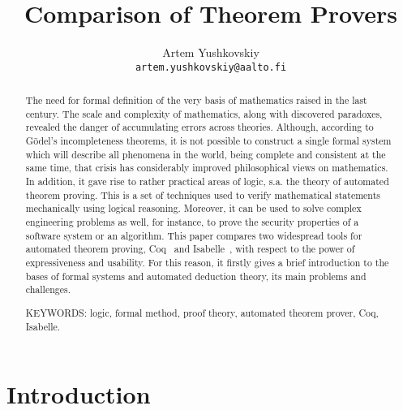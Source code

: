 \documentclass[article]{aaltoseries}
\begin{document}

\title{Comparison of Theorem Provers}

\author{Artem Yushkovskiy
\\\textnormal{\texttt{artem.yushkovskiy@aalto.fi}}}


\maketitle


\begin{abstract}

The need for formal definition of the very basis of mathematics raised in the last century.
The scale and complexity of mathematics, along with discovered paradoxes, revealed the danger of accumulating errors across theories. Although, according to Gödel's incompleteness theorems, it is not possible to construct a single formal system which will describe all phenomena in the world, being complete and consistent at the same time, that crisis has considerably improved philosophical views on mathematics. 
In addition, it gave rise to rather practical areas of logic, s.a. the theory of automated theorem proving. This is a set of techniques used to verify mathematical statements mechanically using logical reasoning. Moreover, it can be used to solve complex engineering problems as well, for instance, to prove the security properties of a software system or an algorithm.
This paper compares two widespread tools for automated theorem proving, Coq~\cite{tool_Coq} and Isabelle~\cite{tool_Isabelle}, with respect to the power of expressiveness and usability. For this reason, it firstly gives a brief introduction to the bases of formal systems and automated deduction theory, its main problems and challenges.

\vspace{3mm}
\noindent KEYWORDS: logic, formal method, proof theory, automated theorem prover, Coq, Isabelle.
	
\end{abstract}



\section{Introduction}
\end{document}
